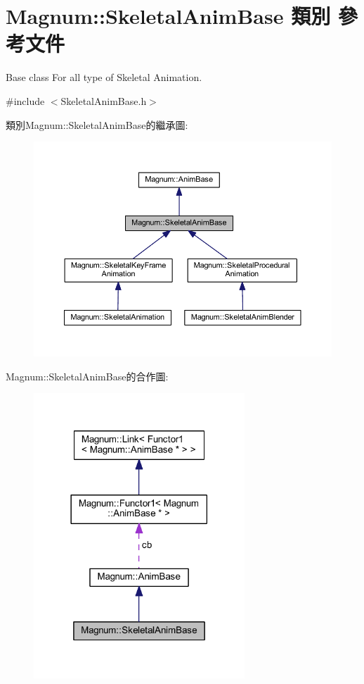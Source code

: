 \hypertarget{class_magnum_1_1_skeletal_anim_base}{}\section{Magnum\+:\+:Skeletal\+Anim\+Base 類別 參考文件}
\label{class_magnum_1_1_skeletal_anim_base}


Base class For all type of Skeletal Animation.  




{\ttfamily \#include $<$Skeletal\+Anim\+Base.\+h$>$}



類別\+Magnum\+:\+:Skeletal\+Anim\+Base的繼承圖\+:\nopagebreak
\begin{figure}[H]
\begin{center}
\leavevmode
\includegraphics[width=350pt]{class_magnum_1_1_skeletal_anim_base__inherit__graph}
\end{center}
\end{figure}


Magnum\+:\+:Skeletal\+Anim\+Base的合作圖\+:\nopagebreak
\begin{figure}[H]
\begin{center}
\leavevmode
\includegraphics[width=225pt]{class_magnum_1_1_skeletal_anim_base__coll__graph}
\end{center}
\end{figure}
